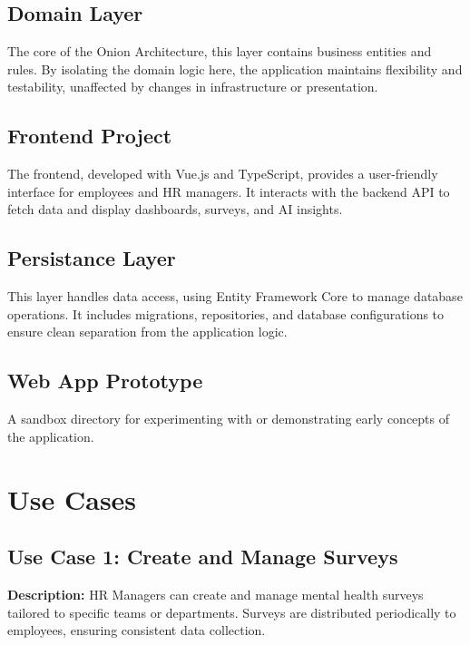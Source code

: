 \documentclass[conference]{IEEEtran}
\begin{document}
        \subsection{Domain Layer}

            The core of the Onion Architecture, this layer contains business entities and rules. By isolating the domain logic here, the application maintains flexibility and testability, unaffected by changes in infrastructure or presentation.
            
        \subsection{Frontend Project}
                    
            The frontend, developed with Vue.js and TypeScript, provides a user-friendly interface for employees and HR managers. It interacts with the backend API to fetch data and display dashboards, surveys, and AI insights.
            
        \subsection{Persistance Layer}

            This layer handles data access, using Entity Framework Core to manage database operations. It includes migrations, repositories, and database configurations to ensure clean separation from the application logic.
            
        \subsection{Web App Prototype}
        
            A sandbox directory for experimenting with or demonstrating early concepts of the application.

    \section{Use Cases}
        
        \subsection{Use Case 1: Create and Manage Surveys}
        
        \textbf{Description:} HR Managers can create and manage mental health surveys tailored to specific teams or departments. Surveys are distributed periodically to employees, ensuring consistent data collection.
        
\end{document}
